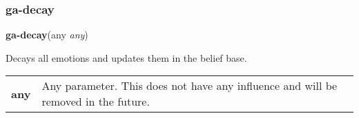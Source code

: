 \subsubsection{ga-decay}

\textbf{ga-decay}(any \emph{any})\vspace{.5em}

\hspace{-\parindent}Decays all emotions and updates them in the belief base.\\[.4em]

\noindent
\begin{tabularx}{\textwidth}{@{}p{4cm} X}
	\textbf{any} & Any parameter. This does not have any influence and will be removed in the future. 
\end{tabularx}